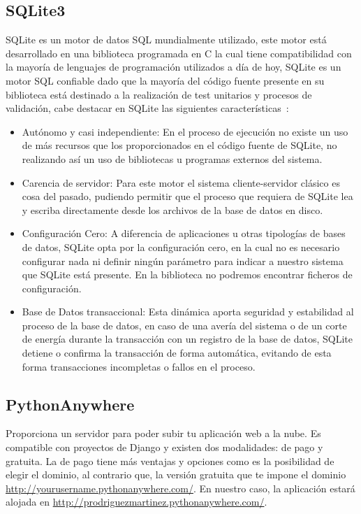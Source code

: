 \documentclass[a4paper, 12pt]{book}
\begin{document}
\subsection{SQLite3}
SQLite es un motor de datos SQL mundialmente utilizado, este motor está desarrollado en una biblioteca programada en C la cual tiene compatibilidad con la mayoría de lenguajes de programación utilizados a día de hoy, SQLite es un motor SQL confiable dado que la mayoría del código fuente presente en su biblioteca está destinado a la realización de test unitarios y procesos de validación, cabe destacar en SQLite las siguientes características~\cite{sqlite}: 
\begin{itemize}
    \item Autónomo y casi independiente: En el proceso de ejecución no existe un uso de más recursos que los proporcionados en el código fuente de SQLite, no realizando así un uso de bibliotecas u programas externos del sistema.
\item Carencia de servidor: Para este motor el sistema cliente-servidor clásico es cosa del pasado, pudiendo permitir que el proceso que requiera de SQLite lea y escriba directamente desde los archivos de la base de datos en disco. 
\item Configuración Cero: A diferencia de aplicaciones u otras tipologías de bases de datos, SQLite opta por la configuración cero, en la cual no es necesario configurar nada ni definir ningún parámetro para indicar a nuestro sistema que SQLite está presente. En la biblioteca no podremos encontrar ficheros de configuración.
\item Base de Datos transaccional: Esta dinámica aporta seguridad y estabilidad al proceso de la base de datos, en caso de una avería del sistema o de un corte de energía durante la transacción con un registro de la base de datos, SQLite detiene o confirma la transacción de forma automática, evitando de esta forma transacciones incompletas o fallos en el proceso.

\end{itemize}
\subsection{PythonAnywhere}
Proporciona un servidor para poder subir tu aplicación web a la nube. Es compatible con proyectos de Django y existen dos modalidades: de pago y gratuita. La de pago tiene más ventajas y opciones como es la posibilidad de elegir el dominio, al contrario que, la versión gratuita que te impone el dominio \url{http://yourusername.pythonanywhere.com/}. En nuestro caso, la aplicación estará alojada en \url{http://prodriguezmartinez.pythonanywhere.com/}.
\end{document}
